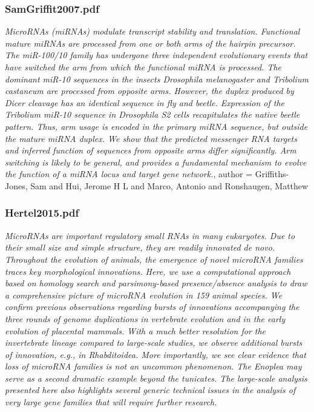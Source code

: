 \subsubsection{SamGriffit2007.pdf}
\cite{Griffiths-Jones2011}
\textit{MicroRNAs (miRNAs) modulate transcript stability and translation. Functional mature miRNAs are processed from one or both arms of the hairpin precursor. The miR-100/10 family has undergone three independent evolutionary events that have switched the arm from which the functional miRNA is processed. The dominant miR-10 sequences in the insects Drosophila melanogaster and Tribolium castaneum are processed from opposite arms. However, the duplex produced by Dicer cleavage has an identical sequence in fly and beetle. Expression of the Tribolium miR-10 sequence in Drosophila S2 cells recapitulates the native beetle pattern. Thus, arm usage is encoded in the primary miRNA sequence, but outside the mature miRNA duplex. We show that the predicted messenger RNA targets and inferred function of sequences from opposite arms differ significantly. Arm switching is likely to be general, and provides a fundamental mechanism to evolve the function of a miRNA locus and target gene network.},
author = {Griffiths-Jones, Sam and Hui, Jerome H L and Marco, Antonio and Ronshaugen, Matthew}

\subsubsection{Hertel2015.pdf}
\cite{Hertel2015}
\textit{MicroRNAs are important regulatory small RNAs in many eukaryotes. Due to their small size and simple structure, they are readily innovated de novo. Throughout the evolution of animals, the emergence of novel microRNA families traces key morphological innovations. Here, we use a computational approach based on homology search and parsimony-based presence/absence analysis to draw a comprehensive picture of microRNA evolution in 159 animal species. We confirm previous observations regarding bursts of innovations accompanying the three rounds of genome duplications in vertebrate evolution and in the early evolution of placental mammals. With a much better resolution for the invertebrate lineage compared to large-scale studies, we observe additional bursts of innovation, e.g., in Rhabditoidea. More importantly, we see clear evidence that loss of microRNA families is not an uncommon phenomenon. The Enoplea may serve as a second dramatic example beyond the tunicates. The large-scale analysis presented here also highlights several generic technical issues in the analysis of very large gene families that will require further research.}

